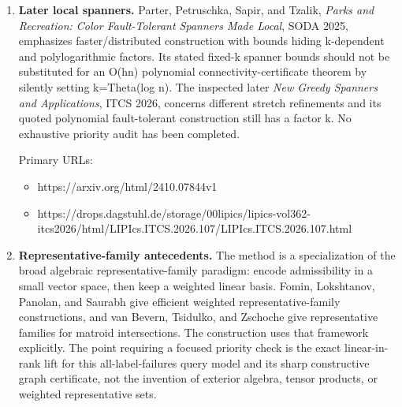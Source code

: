\begin{enumerate}
  The journal version of \emph{Color Fault-Tolerant Spanners} (ACM Transactions on Algorithms 22(1), Article 6, DOI 10.1145/3750728; online publication in October 2025) explicitly includes a color-lists extension. Thus overlapping label lists are an existing graph fault model, not a new model introduced by this manuscript. The publisher PDF could not be fully retrieved during this bounded check, so its exact list-size formulas still need direct comparison. Primary metadata and the publisher-indexed abstract were inspected; this is not a claim to have audited the complete journal revision.

  \begin{itemize}
  \tightlist
  \item
    https://doi.org/10.1145/3750728
  \item
    https://weizmann.elsevierpure.com/en/publications/color-fault-tolerant-spanners-2/
  \end{itemize}
\item
  \textbf{Later local spanners.} Parter, Petruschka, Sapir, and Tzalik, \emph{Parks and Recreation: Color Fault-Tolerant Spanners Made Local}, SODA 2025, emphasizes faster/distributed construction with bounds hiding k-dependent and polylogarithmic factors. Its stated fixed-k spanner bounds should not be substituted for an O(hn) polynomial connectivity-certificate theorem by silently setting k=Theta(log n). The inspected later \emph{New Greedy Spanners and Applications}, ITCS 2026, concerns different stretch refinements and its quoted polynomial fault-tolerant construction still has a factor k. No exhaustive priority audit has been completed.

  Primary URLs:

  \begin{itemize}
  \tightlist
  \item
    https://arxiv.org/html/2410.07844v1
  \item
    https://drops.dagstuhl.de/storage/00lipics/lipics-vol362-itcs2026/html/LIPIcs.ITCS.2026.107/LIPIcs.ITCS.2026.107.html
  \end{itemize}
\item
  \textbf{Representative-family antecedents.} The method is a specialization of the broad algebraic representative-family paradigm: encode admissibility in a small vector space, then keep a weighted linear basis. Fomin, Lokshtanov, Panolan, and Saurabh give efficient weighted representative-family constructions, and van Bevern, Tsidulko, and Zschoche give representative families for matroid intersections. The construction uses that framework explicitly. The point requiring a focused priority check is the exact linear-in-rank lift for this all-label-failures query model and its sharp constructive graph certificate, not the invention of exterior algebra, tensor products, or weighted representative sets.


\end{enumerate}
